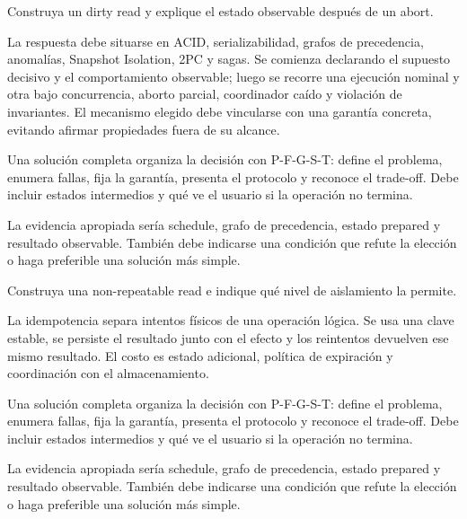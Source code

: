 \documentclass[variant=guia,cover=institutional,mode=screen]{ua-engineering-v6-article}
\begin{document}
\begin{uaexercise}
Construya un dirty read y explique el estado observable después de un abort.
\end{uaexercise}
\begin{uaanswer}
La respuesta debe situarse en ACID, serializabilidad, grafos de precedencia, anomalías, Snapshot Isolation, 2PC y sagas. Se comienza declarando el supuesto decisivo y el comportamiento observable; luego se recorre una ejecución nominal y otra bajo concurrencia, aborto parcial, coordinador caído y violación de invariantes. El mecanismo elegido debe vincularse con una garantía concreta, evitando afirmar propiedades fuera de su alcance.

Una solución completa organiza la decisión con P-F-G-S-T: define el problema, enumera fallas, fija la garantía, presenta el protocolo y reconoce el trade-off. Debe incluir estados intermedios y qué ve el usuario si la operación no termina.

La evidencia apropiada sería schedule, grafo de precedencia, estado prepared y resultado observable. También debe indicarse una condición que refute la elección o haga preferible una solución más simple.
\end{uaanswer}

\begin{uaexercise}
Construya una non-repeatable read e indique qué nivel de aislamiento la permite.
\end{uaexercise}
\begin{uaanswer}
La idempotencia separa intentos físicos de una operación lógica. Se usa una clave estable, se persiste el resultado junto con el efecto y los reintentos devuelven ese mismo resultado. El costo es estado adicional, política de expiración y coordinación con el almacenamiento.

Una solución completa organiza la decisión con P-F-G-S-T: define el problema, enumera fallas, fija la garantía, presenta el protocolo y reconoce el trade-off. Debe incluir estados intermedios y qué ve el usuario si la operación no termina.

La evidencia apropiada sería schedule, grafo de precedencia, estado prepared y resultado observable. También debe indicarse una condición que refute la elección o haga preferible una solución más simple.
\end{uaanswer}
\end{document}
